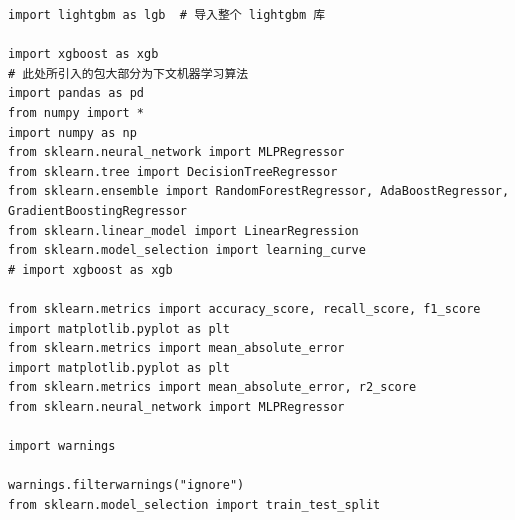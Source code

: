 \documentclass[a4paper,12pt]{article}
\begin{document}
\begin{lstlisting}
import lightgbm as lgb  # 导入整个 lightgbm 库

import xgboost as xgb
# 此处所引入的包大部分为下文机器学习算法
import pandas as pd
from numpy import *
import numpy as np
from sklearn.neural_network import MLPRegressor
from sklearn.tree import DecisionTreeRegressor
from sklearn.ensemble import RandomForestRegressor, AdaBoostRegressor, GradientBoostingRegressor
from sklearn.linear_model import LinearRegression
from sklearn.model_selection import learning_curve
# import xgboost as xgb

from sklearn.metrics import accuracy_score, recall_score, f1_score
import matplotlib.pyplot as plt
from sklearn.metrics import mean_absolute_error
import matplotlib.pyplot as plt
from sklearn.metrics import mean_absolute_error, r2_score
from sklearn.neural_network import MLPRegressor

import warnings

warnings.filterwarnings("ignore")
from sklearn.model_selection import train_test_split
\end{lstlisting}
\end{document}
